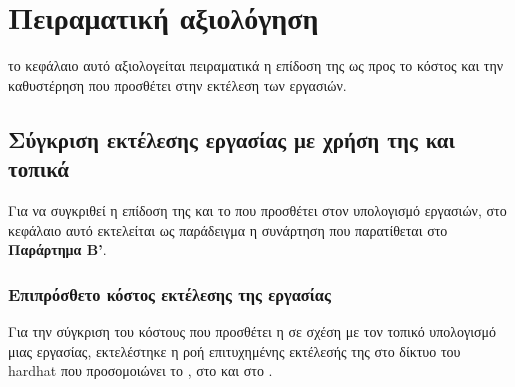 \chapter{Πειραματική αξιολόγηση}
το κεφάλαιο αυτό αξιολογείται πειραματικά η επίδοση της  ως προς το κόστος και την καθυστέρηση που προσθέτει στην εκτέλεση των εργασιών.


\section{Σύγκριση εκτέλεσης εργασίας με χρήση της  και τοπικά}
Για να συγκριθεί η επίδοση της  και το  που προσθέτει στον υπολογισμό εργασιών, στο κεφάλαιο αυτό εκτελείται ως παράδειγμα η συνάρτηση που παρατίθεται στο \textbf{Παράρτημα B'}.

\subsection{Επιπρόσθετο κόστος εκτέλεσης της εργασίας}
Για την σύγκριση του κόστους που προσθέτει η  σε σχέση με τον τοπικό υπολογισμό μιας εργασίας, εκτελέστηκε η ροή επιτυχημένης εκτέλεσής της στο  δίκτυο του {hardhat} που προσομοιώνει το , στο  και στο .

